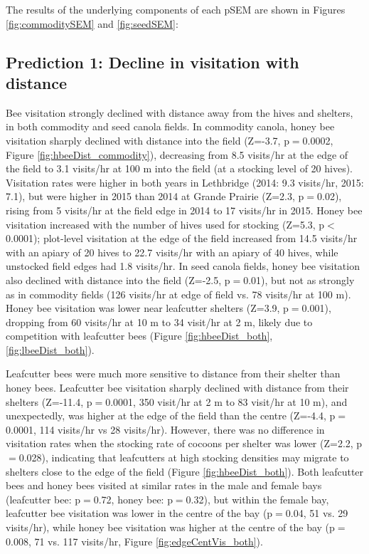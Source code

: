 \documentclass[12pt]{article} %
\begin{document}
The results of the underlying components of each pSEM are shown in Figures \ref{fig:commoditySEM} and \ref{fig:seedSEM}:

\subsection{Prediction 1: Decline in visitation with distance}
Bee visitation strongly declined with distance away from the hives and shelters, in both commodity and seed canola fields. 
In commodity canola, honey bee visitation sharply declined with distance into the field (Z=-3.7, p$=$0.0002, Figure \ref{fig:hbeeDist_commodity}), decreasing from 8.5 visits/hr at the edge of the field to 3.1 visits/hr at 100 m into the field (at a stocking level of 20 hives).
Visitation rates were higher in both years in Lethbridge (2014: 9.3 visits/hr, 2015: 7.1), but were higher in 2015 than 2014 at Grande Prairie (Z=2.3, p$=$0.02), rising from 5 visits/hr at the field edge in 2014 to 17 visits/hr in 2015. %
Honey bee visitation increased with the number of hives used for stocking (Z=5.3, p$<$0.0001); plot-level visitation at the edge of the field increased from 14.5 visits/hr with an apiary of 20 hives to 22.7 visits/hr with an apiary of 40 hives, while unstocked field edges had 1.8 visits/hr.
In seed canola fields, honey bee visitation also declined with distance into the field (Z=-2.5, p$=$0.01), but not as strongly as in commodity fields (126 visits/hr at edge of field vs. 78 visits/hr at 100 m). 
Honey bee visitation was lower near leafcutter shelters (Z=3.9, p$=$0.001), dropping from 60 visits/hr at 10 m to 34 visit/hr at 2 m, likely due to competition with leafcutter bees (Figure \ref{fig:hbeeDist_both}, \ref{fig:lbeeDist_both}).

Leafcutter bees were much more sensitive to distance from their shelter than honey bees.
Leafcutter bee visitation sharply declined with distance from their shelters (Z=-11.4, p$=$0.0001, 350 visit/hr at 2 m to 83 visit/hr at 10 m), and unexpectedly, was higher at the edge of the field than the centre (Z=-4.4, p$=$0.0001, 114 visits/hr vs 28 visits/hr).
However, there was no difference in visitation rates when the stocking rate of cocoons per shelter was lower (Z=2.2, p$=$0.028), indicating that leafcutters at high stocking densities may migrate to shelters close to the edge of the field (Figure \ref{fig:hbeeDist_both}).
Both leafcutter bees and honey bees visited at similar rates in the male and female bays (leafcutter bee: p$=$0.72, honey bee: p$=$0.32), but within the female bay, leafcutter bee visitation was lower in the centre of the bay (p$=$0.04, 51 vs. 29 visits/hr), while honey bee visitation was higher at the centre of the bay (p$=$0.008, 71 vs. 117 visits/hr, Figure \ref{fig:edgeCentVis_both}).
\end{document}
